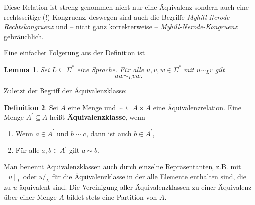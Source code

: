 \documentclass[11pt, a4paper]{article}
\theoremstyle{definition}
\newtheorem{definition}{Definition}
\theoremstyle{plain}
\newtheorem{lemma}[definition]{Lemma}
\begin{document}
Diese Relation ist streng genommen nicht nur eine Äquivalenz sondern auch eine rechtsseitige (!) Kongruenz, deswegen sind auch die Begriffe \textit{Myhill-Nerode-Rechtskongruenz} und -- nicht ganz korrekterweise -- \textit{Myhill-Nerode-Kongruenz} gebräuchlich.

Eine einfacher Folgerung aus der Definition ist
\begin{lemma}\label{kongruenzlemma}
	Sei \( L \subseteq \Sigma^\ast \) eine Sprache. Für alle \( u, v, w \in \Sigma^\ast \) mit \( u \sim_L v \) gilt
	\[
		uw \sim_L vw.
	\]
\end{lemma}

Zuletzt der Begriff der Äquivalenzklasse:
\begin{definition}
	Sei \( A \) eine Menge und \( \sim \subseteq A \times A \) eine Äquivalenzrelation. Eine Menge \( A^\prime \subseteq A \) heißt \textbf{Äquivalenzklasse}, wenn
	\begin{enumerate}
		\item Wenn \( a \in A^\prime \) und \( b \sim a \), dann ist auch \( b \in A^\prime \),
		\item Für alle \( a, b \in A^\prime \) gilt \( a \sim b \).
	\end{enumerate}
\end{definition}

Man benennt Äquivalenzklassen auch durch einzelne Repräsentanten, z.B. mit \( [u]_L \) oder \( u/_L \) für die Äquivalenzklasse in der alle Elemente enthalten sind, die zu \( u \) äquivalent sind.
Die Vereinigung aller Äquivalenzklassen zu einer Äquivalenz über einer Menge \( A \) bildet stets eine Partition von \( A \).
\end{document}
